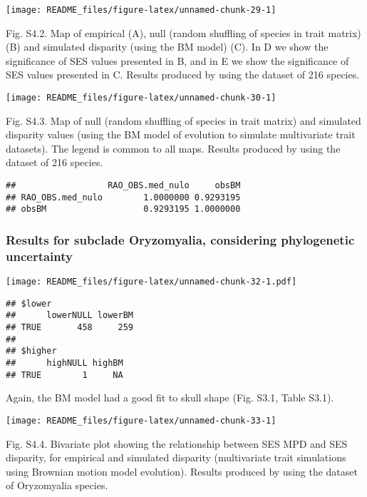 \documentclass[
]{article}
\begin{document}
\begin{center}\texttt{[image: README\_files/figure-latex/unnamed-chunk-29-1]} \end{center}

Fig. S4.2. Map of empirical (A), null (random shuffling of species in
trait matrix) (B) and simulated disparity (using the BM model) (C). In D
we show the significance of SES values presented in B, and in E we show
the significance of SES values presented in C. Results produced by using
the dataset of 216 species.

\begin{center}\texttt{[image: README\_files/figure-latex/unnamed-chunk-30-1]} \end{center}

Fig. S4.3. Map of null (random shuffling of species in trait matrix) and
simulated disparity values (using the BM model of evolution to simulate
multivariate trait datasets). The legend is common to all maps. Results
produced by using the dataset of 216 species.

\begin{verbatim}
##                  RAO_OBS.med_nulo     obsBM
## RAO_OBS.med_nulo        1.0000000 0.9293195
## obsBM                   0.9293195 1.0000000
\end{verbatim}

\hypertarget{results-for-subclade-oryzomyalia-considering-phylogenetic-uncertainty-1}{%
\subsubsection{Results for subclade Oryzomyalia, considering
phylogenetic
uncertainty}\label{results-for-subclade-oryzomyalia-considering-phylogenetic-uncertainty-1}}

\texttt{[image: README\_files/figure-latex/unnamed-chunk-32-1.pdf]}

\begin{verbatim}
## $lower
##      lowerNULL lowerBM
## TRUE       458     259
## 
## $higher
##      highNULL highBM
## TRUE        1     NA
\end{verbatim}

Again, the BM model had a good fit to skull shape (Fig. S3.1, Table
S3.1).

\begin{center}\texttt{[image: README\_files/figure-latex/unnamed-chunk-33-1]} \end{center}

Fig. S4.4. Bivariate plot showing the relationship between SES MPD and
SES disparity, for empirical and simulated disparity (multivariate trait
simulations using Brownian motion model evolution). Results produced by
using the dataset of Oryzomyalia species.
\end{document}
